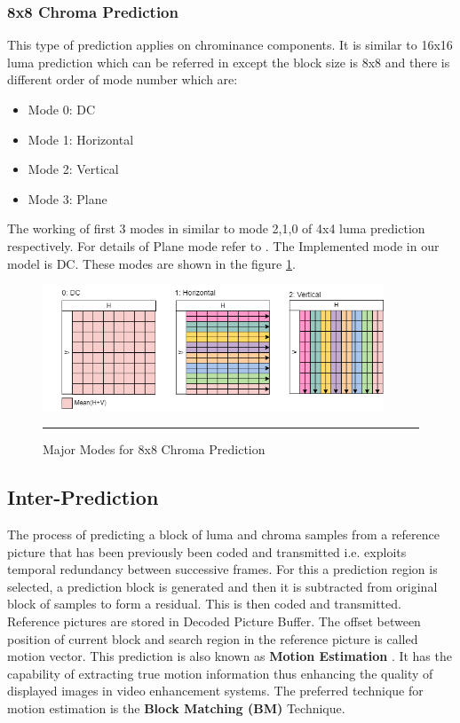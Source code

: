 \subsubsection{8x8 Chroma Prediction}
This type of prediction applies on chrominance components. It is similar to 16x16 luma prediction which can be referred in \cite{richardson2010h264} except the block size is 8x8 and there is different order of mode number which are:

\begin{itemize}
	\item Mode 0: DC
	\item Mode 1: Horizontal
	\item Mode 2: Vertical
	\item Mode 3: Plane
\end{itemize}

The working of first 3 modes in similar to mode 2,1,0 of 4x4 luma prediction respectively. For details of Plane mode refer to \cite{richardson2010h264}. The Implemented mode in our model is DC. These modes are shown in the figure \ref{fig:8x8modes}.

\begin{figure}[H]
	\centering
	\includegraphics[width = 4in]{./Figures/8x8modes.png}
	\rule{35em}{0.5pt}
	\caption{Major Modes for 8x8 Chroma Prediction}
	\label{fig:8x8modes}
\end{figure}


\subsection{Inter-Prediction}
The process of predicting a block of luma and chroma samples from a reference picture that has been previously been coded and transmitted i.e. exploits temporal redundancy between successive frames. For this a prediction region is selected, a prediction block is generated and then it is subtracted from original block of samples to form a residual. This is then coded and transmitted. Reference pictures are stored in Decoded Picture Buffer. The offset between position of current block and search region in the reference picture is called motion vector. This prediction is also known as \textbf{Motion Estimation} \cite{kalaycioglu2011low}. It has the capability of extracting true motion information thus enhancing the quality of displayed images in video enhancement systems. The preferred technique for motion estimation is the \textbf{Block Matching (BM)} Technique. 


